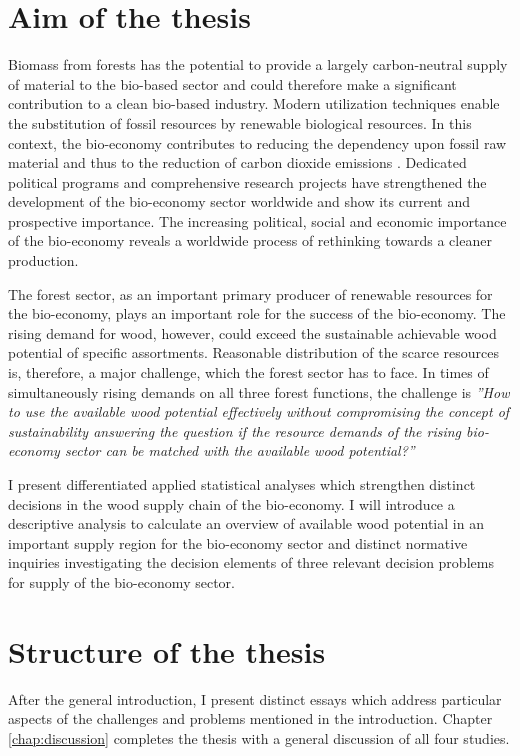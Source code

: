 \section{Aim of the thesis}
\label{sec:intro:aim}
Biomass from forests has the potential to provide a largely carbon-neutral supply of material to the bio-based sector and could therefore make a significant contribution to a clean bio-based industry. Modern utilization techniques enable the substitution of fossil resources by renewable biological resources. In this context, the bio-economy contributes to reducing the dependency upon fossil raw material and thus to the reduction of carbon dioxide emissions \citep[p. 4]{ingrao_2016}. Dedicated political programs and comprehensive research projects have strengthened the development of the bio-economy sector worldwide and show its current and prospective importance. The increasing political, social and economic importance of the bio-economy \citep[e.g.][p. 15-16]{bmel_2014b} reveals a worldwide process of rethinking towards a cleaner production.

The forest sector, as an important primary producer of renewable resources for the bio-economy, plays an important role for the success of the bio-economy. The rising demand for wood, however, could exceed the sustainable achievable wood potential of specific assortments. Reasonable distribution of the scarce resources is, therefore, a major challenge, which the forest sector has to face. In times of simultaneously rising demands on all three forest functions, the challenge is \textit{''How to use the available wood potential effectively without compromising the concept of sustainability answering the question if the resource demands of the rising bio-economy sector can be matched with the available wood potential?''}

I present differentiated applied statistical analyses which strengthen distinct decisions in the wood supply chain of the bio-economy. I will introduce a descriptive analysis to calculate an overview of available wood potential in an important supply region for the bio-economy sector and distinct normative inquiries investigating the decision elements of three relevant decision problems for supply of the bio-economy sector.
	
\section{Structure of the thesis}
\label{sec:intro:struct}
After the general introduction, I present distinct essays which address particular aspects of the challenges and problems mentioned in the introduction. Chapter \ref{chap:discussion} completes the thesis with a general discussion of all four studies.

